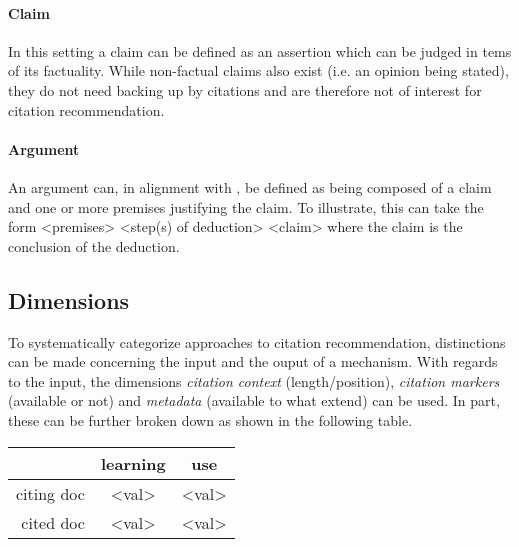 \documentclass{proseminar}
\begin{document}
\paragraph{Claim}
In this setting a claim can be defined as an assertion which can be judged in tems of its factuality. While non-factual claims also exist (i.e. an opinion being stated), they do not need backing up by citations and are therefore not of interest for citation recommendation.

\paragraph{Argument}
An argument can, in alignment with \cite{Besnard2008}, be defined as being composed of a claim and one or more premises justifying the claim. To illustrate, this can take the form <premises> <step(s) of deduction> <claim> where the claim is the conclusion of the deduction.

\subsection{Dimensions}\label{dimensions}
To systematically categorize approaches to citation recommendation, distinctions can be made concerning the input and the ouput of a mechanism. With regards to the input, the dimensions \emph{citation context} (length/position), \emph{citation markers} (available or not) and \emph{metadata} (available to what extend) can be used. In part, these can be further broken down as shown in the following table.

\begin{table}[!htbp]
\centering
\begin{tabular}{r|c|c}
&learning&use\\ \hline
citing doc & <val> & <val>\\ \hline
cited doc & <val> & <val>\\
\end{tabular}
\end{table}
\end{document}
